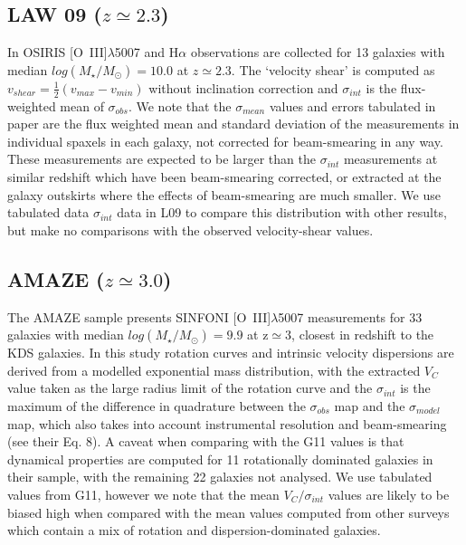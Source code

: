 \documentclass[fleqn,usenatbib]{mn2e}
\begin{document}
\subsection{LAW 09 ($z\simeq2.3$)}\label{subsec:law_09}
In \cite[L09]{Law2009} OSIRIS [O~{\sc III}]$\lambda$5007 and H$\alpha$ observations are collected for 13 galaxies with median $log(M_{\star}/M_{\odot})=10.0$ at $z\simeq2.3$.
The `velocity shear' is computed as $v_{shear} = \frac{1}{2}(v_{max} - v_{min})$ without inclination correction and $\sigma_{int}$ is the flux-weighted mean of $\sigma_{obs}$.
We note that the $\sigma_{mean}$ values and errors tabulated in \cite{Law2009} paper are the flux weighted mean and standard deviation of the measurements in individual spaxels in each galaxy, not corrected for beam-smearing in any way.
These measurements are expected to be larger than the $\sigma_{int}$ measurements at similar redshift which have been beam-smearing corrected, or extracted at the galaxy outskirts where the effects of beam-smearing are much smaller.
We use tabulated data $\sigma_{int}$ data in L09 to compare this distribution with other results, but make no comparisons with the observed velocity-shear values.

\subsection{AMAZE ($z\simeq3.0$)}\label{subsec:AMAZE}
The AMAZE sample \cite[G11]{Gnerucci2011} presents SINFONI [O~{\sc III}]$\lambda$5007 measurements for 33 galaxies with median $log(M_{\star}/M_{\odot})=9.9$ at z$\simeq3$, closest in redshift to the KDS galaxies.
In this study rotation curves and intrinsic velocity dispersions are derived from a modelled exponential mass distribution, with the extracted $V_{C}$ value taken as the large radius limit of the rotation curve and the $\sigma_{int}$ is the maximum of the difference in quadrature between the $\sigma_{obs}$ map and the $\sigma_{model}$ map, which also takes into account instrumental resolution and beam-smearing (see their Eq. 8).
A caveat when comparing with the G11 values is that dynamical properties are computed for 11 rotationally dominated galaxies in their sample, with the remaining 22 galaxies not analysed.
We use tabulated values from G11, however we note that the mean $V_{C}/\sigma_{int}$ values are likely to be biased high when compared with the mean values computed from other surveys which contain a mix of rotation and dispersion-dominated galaxies. \\
\end{document}
